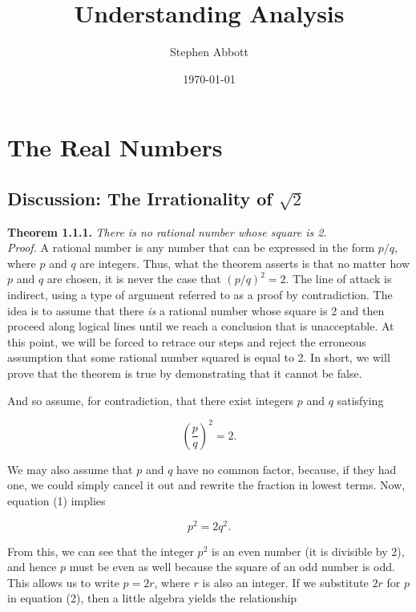 \documentclass{report}
\title{Understanding Analysis}
\author{Stephen Abbott}
\date{\today}
\numberwithin{equation}{section}
\begin{document}

\maketitle

\tableofcontents

\chapter{The Real Numbers}

\section{Discussion: The Irrationality of $\sqrt{2}$}

\textbf{Theorem 1.1.1.} \emph{There is no rational number whose square is 2.}
\\
\emph{Proof.} A rational number is any number that can be expressed in the form $p/q$, where $p$ and $q$ are integers. Thus, what the theorem asserts is that no matter how $p$ and $q$ are chosen, it is never the case that $(p/q)^2 = 2$. The line of attack is indirect, using a type of argument referred to as a proof by contradiction. The idea is to assume that there \emph{is} a rational number whose square is 2 and then proceed along logical lines until we reach a conclusion that is unacceptable. At this point, we will be forced to retrace our steps and reject the erroneous assumption that some rational number squared is equal to 2. In short, we will prove that the theorem is true by demonstrating that it cannot be false.

And so assume, for contradiction, that there exist integers $p$ and $q$ satisfying

\begin{equation}
    \left(\frac{p}{q}\right)^2 = 2.
\end{equation}

We may also assume that $p$ and $q$ have no common factor, because, if they had one, we could simply cancel it out and rewrite the fraction in lowest terms. Now, equation (1) implies

\begin{equation}
    p^2 = 2q^2.
\end{equation}

From this, we can see that the integer $p^2$ is an even number (it is divisible by 2), and hence $p$ must be even as well because the square of an odd number is odd. This allows us to write $p = 2r$, where $r$ is also an integer. If we substitute $2r$ for $p$ in equation (2), then a little algebra yields the relationship
\end{document}
